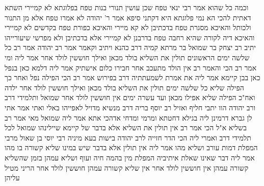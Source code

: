 \documentclass[12pt, openany]{book}
\begin{document}
{וכמה כל שהוא  אמר רבי ינאי  טפח שכן עושין תנורי בנות טפח  בפלוגתא לא קמיירי 
השתא דאתית להכי הא נמי פלוגתא היא  דקתני סיפא  אמר ר' יהודה לא אמרו טפח אלא מן התנור ולכותל 
והאיכא מסגרת טפח  בדכתיבן לא קא מיירי  והאיכא כפורת טפח  בקדשים לא קמיירי 
והאיכא  דיה לקורה שהיא רחבה טפח  בדרבנן לא קמיירי אלא בדכתיבן ולא מפרשי שיעורייהו 
יתיב רב יצחק בר שמואל בר מרתא קמיה דרב כהנא ויתיב וקאמר אמר רב יהודה אמר רב  כל שלשה ימים הראשונים תולין את השליא בולד מכאן ואילך חוששין לולד אחר 
אמר ליה  ומי אמר רב הכי  והאמר רב  אין הולד מתעכב אחר חבירו כלום  אישתיק  אמר ליה  דלמא כאן בנפל כאן בבן קיימא 
אמר ליה  את אמרת לשמעתתיה דרב  בפירוש אמר רב הכי  הפילה נפל ואחר כך הפילה שליא כל שלשה ימים תולין את השליא בולד מכאן ואילך חוששין לולד אחר  ילדה ואח"כ הפילה שליא אפילו מכאן ועד עשרה ימים אין חוששין לולד אחר 
שמואל ותלמידי דרב ורב יהודה הוו יתבי  חליף ואזיל רב יוסף בריה דרב מנשיא מדויל לאפייהו באלי ואתי אמר  אתי לן גברא דרמינן ליה בגילא דחטתא ומרמי ומדחי 
אדהכי אתא  אמר ליה שמואל  מאי אמר רב בשליא  א"ל הכי אמר רב  אין תולין את השליא אלא בדבר של קיימא  שיילינהו שמואל לכל תלמידי דרב ואמרי ליה הכי הדר חזייה לרב יהודה בישות 
בעא מיניה רבי יוסי בן שאול מרבי  המפלת דמות עורב ושליא מהו  אמר ליה  אין תולין אלא בדבר שיש במינו שליא 
קשורה בו מהו  אמר ליה  דבר שאינו שאלת  איתיביה  המפלת מין בהמה חיה ועוף ושליא עמהן בזמן שהשליא קשורה עמהן אין חוששין לולד אחר אין שליא קשורה עמהן חוששין לולד אחר הריני מטיל עליהן}
\end{document}
